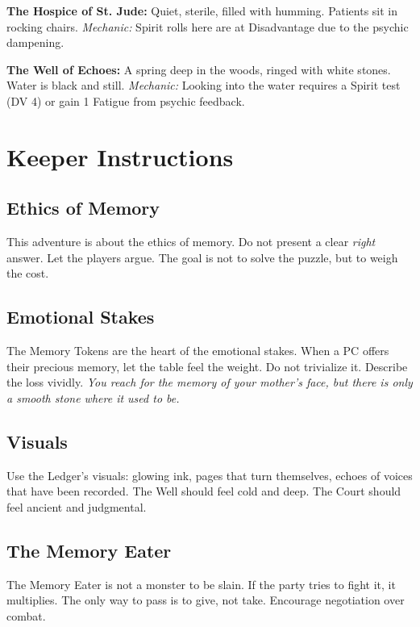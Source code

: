 \documentclass[12pt]{book}
\begin{document}
\textbf{The Hospice of St. Jude:}
Quiet, sterile, filled with humming. Patients sit in rocking chairs.
\textit{Mechanic:} Spirit rolls here are at Disadvantage due to the psychic dampening.

\textbf{The Well of Echoes:}
A spring deep in the woods, ringed with white stones. Water is black and still.
\textit{Mechanic:} Looking into the water requires a Spirit test (DV 4) or gain 1 Fatigue from psychic feedback.

\chapter{Keeper Instructions}

\section{Ethics of Memory}

This adventure is about the ethics of memory. Do not present a clear \textit{right} answer. Let the players argue. The goal is not to solve the puzzle, but to weigh the cost.

\section{Emotional Stakes}

The Memory Tokens are the heart of the emotional stakes. When a PC offers their precious memory, let the table feel the weight. Do not trivialize it. Describe the loss vividly. \textit{You reach for the memory of your mother's face, but there is only a smooth stone where it used to be.}

\section{Visuals}

Use the Ledger's visuals: glowing ink, pages that turn themselves, echoes of voices that have been recorded. The Well should feel cold and deep. The Court should feel ancient and judgmental.

\section{The Memory Eater}

The Memory Eater is not a monster to be slain. If the party tries to fight it, it multiplies. The only way to pass is to give, not take. Encourage negotiation over combat.
\end{document}
